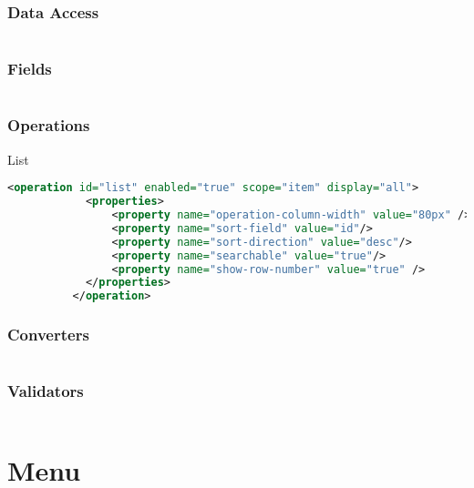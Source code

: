 \subsubsection{Data Access}
\begin{lstlisting}[language=XML]

\end{lstlisting}
\subsubsection{Fields}
\begin{lstlisting}[language=XML]

\end{lstlisting}
\subsubsection{Operations}

List

\begin{lstlisting}[language=XML]
          <operation id="list" enabled="true" scope="item" display="all">
            <properties>
                <property name="operation-column-width" value="80px" />
                <property name="sort-field" value="id"/>
                <property name="sort-direction" value="desc"/>
                <property name="searchable" value="true"/>
                <property name="show-row-number" value="true" />
            </properties>
          </operation>
\end{lstlisting}



\subsubsection{Converters}
\begin{lstlisting}[language=XML]

\end{lstlisting}
\subsubsection{Validators}
\begin{lstlisting}[language=XML]

\end{lstlisting}



\section{Menu}

